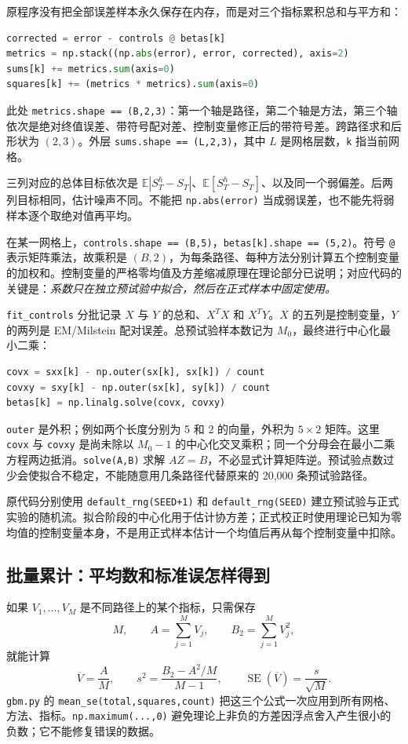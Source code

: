 \documentclass[11pt,a4paper,fontset=none]{ctexart}
\numberwithin{equation}{section}
\newcommand{\E}{\mathbb E}
\begin{document}
原程序没有把全部误差样本永久保存在内存，而是对三个指标累积总和与平方和：
\begin{lstlisting}[language=Python]
corrected = error - controls @ betas[k]
metrics = np.stack((np.abs(error), error, corrected), axis=2)
sums[k] += metrics.sum(axis=0)
squares[k] += (metrics * metrics).sum(axis=0)
\end{lstlisting}
此处 \texttt{metrics.shape == (B,2,3)}：第一个轴是路径，第二个轴是方法，第三个轴依次是绝对终值误差、带符号配对差、控制变量修正后的带符号差。跨路径求和后形状为 $(2,3)$。外层 \texttt{sums.shape == (L,2,3)}，其中 $L$ 是网格层数，\texttt{k} 指当前网格。

三列对应的总体目标依次是 $\E|S_T^h-S_T|$、$\E[S_T^h-S_T]$、以及同一个弱偏差。后两列目标相同，估计噪声不同。不能把 \texttt{np.abs(error)} 当成弱误差，也不能先将弱样本逐个取绝对值再平均。

在某一网格上，\texttt{controls.shape == (B,5)}，\texttt{betas[k].shape == (5,2)}。符号 \texttt{@} 表示矩阵乘法，故乘积是 $(B,2)$，为每条路径、每种方法分别计算五个控制变量的加权和。控制变量的严格零均值及方差缩减原理在理论部分已说明；对应代码的关键是：\emph{系数只在独立预试验中拟合，然后在正式样本中固定使用。}

\texttt{fit\_controls} 分批记录 $X$ 与 $Y$ 的总和、$X^TX$ 和 $X^TY$。$X$ 的五列是控制变量，$Y$ 的两列是 EM/Milstein 配对误差。总预试验样本数记为 $M_0$，最终进行中心化最小二乘：
\begin{lstlisting}[language=Python]
covx = sxx[k] - np.outer(sx[k], sx[k]) / count
covxy = sxy[k] - np.outer(sx[k], sy[k]) / count
betas[k] = np.linalg.solve(covx, covxy)
\end{lstlisting}
\texttt{outer} 是外积；例如两个长度分别为 5 和 2 的向量，外积为 $5\times2$ 矩阵。这里 \texttt{covx} 与 \texttt{covxy} 是尚未除以 $M_0-1$ 的中心化交叉乘积；同一个分母会在最小二乘方程两边抵消。\texttt{solve(A,B)} 求解 $AZ=B$，不必显式计算矩阵逆。预试验点数过少会使拟合不稳定，不能随意用几条路径代替原来的 20,000 条预试验路径。

原代码分别使用 \texttt{default\_rng(SEED+1)} 和 \texttt{default\_rng(SEED)} 建立预试验与正式实验的随机流。拟合阶段的中心化用于估计协方差；正式校正时使用理论已知为零均值的控制变量本身，不是用正式样本估计一个均值后再从每个控制变量中扣除。

\subsection{批量累计：平均数和标准误怎样得到}

如果 $V_1,\ldots,V_M$ 是不同路径上的某个指标，只需保存
\[
M,\qquad A=\sum_{j=1}^M V_j,\qquad B_2=\sum_{j=1}^M V_j^2,
\]
就能计算
\begin{equation}
\overline V=\frac{A}{M},\qquad
s^2=\frac{B_2-A^2/M}{M-1},\qquad
\operatorname{SE}(\overline V)=\frac{s}{\sqrt M}.
\label{code:streaming}
\end{equation}
\texttt{gbm.py} 的 \texttt{mean\_se(total,squares,count)} 把这三个公式一次应用到所有网格、方法、指标。\texttt{np.maximum(...,0)} 避免理论上非负的方差因浮点舍入产生很小的负数；它不能修复错误的数据。
\end{document}
